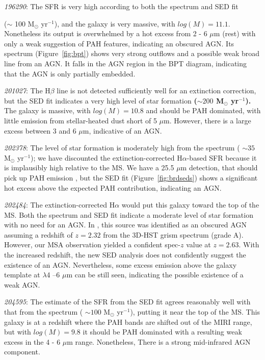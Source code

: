 \documentclass[twocolumn]{aastex63}
\begin{document}
{\it 196290}: The SFR is very high according to both the spectrum and SED fit { ($\sim$ 100 M$_\odot$ yr$^{-1}$), and the galaxy is very massive, with $log(M) =  11.1$. Nonetheless its output is  overwhelmed by a hot excess from 2 - 6 $\mu$m (rest) with only a weak suggestion of PAH features, indicating an obscured AGN.  Its spectrum (Figure~\ref{fig:bpt}) shows very strong outflows and a possible  weak broad line from an AGN. It falls in the AGN region in the BPT diagram, indicating that the AGN is only partially embedded.


{\it 201027}: The H$\beta$ line is not detected sufficiently well for an extinction correction, but the SED fit indicates a very high level of star formation {\bf ($\sim 200$ M$_\odot$ yr$^{-1}$).} The galaxy is massive, with $log(M) = 10.8$ and should be PAH dominated, with little emission from stellar-heated dust short of 5 $\mu$m. However, there is a large excess between 3 and 6 $\mu$m, indicative of an AGN.

{\it 202378}: The level of star formation is moderately  high from the spectrum  ( $\sim 35$ M$_\odot$ yr$^{-1}$); we have discounted the extinction-corrected H$\alpha$-based SFR because it is implausibly high relative to the MS. We have a 25.5 $\mu$m detection, that should pick up PAH emission , but the SED fit (Figure~\ref{fig:brdseds}) shows a significant hot excess above the expected PAH contribution, indicating an AGN. 

{\it 202484}: The extinction-corrected H$\alpha$ would put this galaxy toward the top of the MS.  Both the spectrum and SED
 fit indicate a moderate level of star formation with no need for an AGN. %
In \cite{Lyu2024}, this source was identified as an obscured AGN assuming a redshift of $z=2.32$ from the 3D-HST grism spectrum (grade A). However, our MSA observation yielded a confident spec-$z$ value at $z=2.63$. With the increased redshift, the new SED analysis does not confidently suggest the existence of an AGN. Nevertheless, some excess emission above the galaxy template at $\lambda$4 --6 $\mu$m can be still seen, indicating the possible existence of a weak AGN.

 {\it 204595}: The estimate of the SFR from the SED fit agrees reasonably well with that from the spectrum   ( $\sim 100$ M$_\odot$ yr$^{-1}$), putting it near the top of the MS. This galaxy is at a redshift where the PAH bands are shifted out of the MIRI range, but with $log(M) = 9.8$ it should be PAH dominated with a resulting weak excess in the 4 - 6 $\mu$m range. Nonetheless,  There is a  strong mid-infrared AGN component.

}
\end{document}

